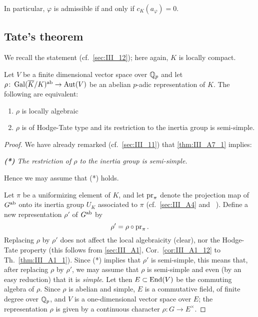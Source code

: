 \begin{subappendices}
\begin{enumerate}
	In particular, $\varphi$ is admissible if and only if $c_K(a_\varphi) =
	0$.
\end{enumerate}

\subsection{Tate's theorem}
\label{sec:III_A7}
We recall the statement (cf.\ \ref{sec:III_12}); here again, $K$ is locally
compact.

\begin{thm}
	Let $V$ be a finite dimensional vector space over $\mathbb{Q}_p$ and let $\rho
	\colon \operatorname{Gal}(\overline{K}/K)^{\mathrm{ab}} \to \operatorname{Aut}(V)$\label{errata:Gal_to_Gab} be
	an abelian $p$-adic representation of $K$.
	The following are equivalent:
	\begin{enumerate}[(1)]
	\item\label{thm:III_A7_1} $\rho$ is locally algebraic
	\item\label{thm:III_A7_2} $\rho$ is of Hodge-Tate type and its
		restriction to the inertia group is semi-simple.
	\end{enumerate}
\end{thm}
\begin{proof}
	We have already remarked (cf.\ \ref{sec:III_11}) that
	\ref{thm:III_A7_1} implies:
	\begin{displayquote}
		\emph{\textbf{(*)} The restriction of $\rho$ to the inertia
		group is semi-simple.}
	\end{displayquote}
	Hence we may assume that (*) holds.

	Let $\pi$ be a uniformizing element of $K$, and let $\operatorname{pr}_\pi$ denote
	the projection map of $G^{\mathrm{ab}}$ onto its inertia group $U_K$ associated
	to $\pi$ (cf.\ \ref{sec:III_A4} and \citeauthor{6}~\cite[144-145]{6}).
	Define a new representation $\rho'$ of $G^{\mathrm{ab}}$ by
	\[
		\rho' = \rho \circ \operatorname{pr}_\pi.
	\]
	Replacing $\rho$ by $\rho'$ does not affect the local algebraicity
	(clear), nor the Hodge-Tate property (this follows from
	\ref{sec:III_A1}, Cor.~\ref{cor:III_A1_12} to Th.~\ref{thm:III_A1_1}).
	Since (*) implies that $\rho'$ is semi-simple, this means that, after
	\dpage
	replacing $\rho$ by $\rho'$, we may assume that $\rho$ is semi-simple
	and even (by an easy reduction) that it is \emph{simple}. Let then $E
	\subset \operatorname{End}(V)$ be the commuting algebra of $\rho$. Since $\rho$ is
	abelian and simple, $E$ is a commutative field, of finite degree over
	$\mathbb{Q}_p$, and $V$ is a one-dimensional vector space over $E$; the
	representation $\rho$ is given by a continuous character $\rho \colon G
	\to E^\times$.


\end{proof}
\end{subappendices}
